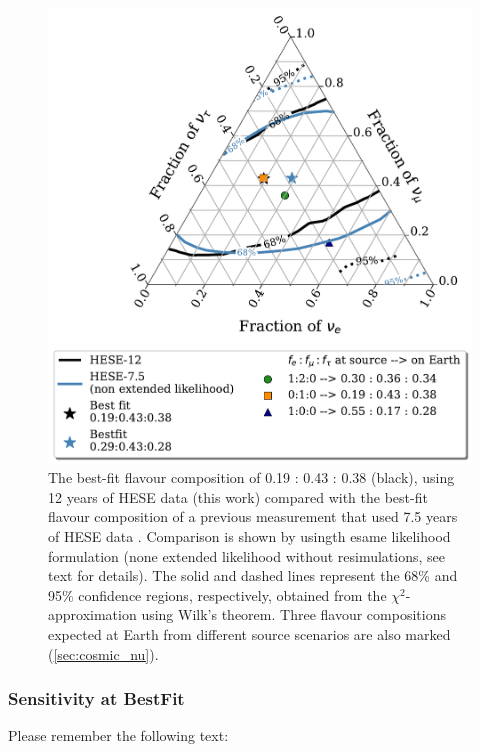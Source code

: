 \begin{figure}[h!]
    \caption{The best-fit flavour composition of 0.19 : 0.43 : 0.38 (black), using 12 years of HESE data (this work) compared with the best-fit flavour composition of a previous measurement that used 7.5 years of HESE data \cite{Juliana_paper}. Comparison is shown by usingth esame likelihood formulation (none extended likelihood without resimulations, see text for details). The solid and dashed lines represent the 68\% and 95\% confidence regions, respectively, obtained from the $\chi^2$-approximation using Wilk's theorem. Three flavour compositions expected at Earth from different source scenarios are also marked (\ref{sec:cosmic_nu}).}
    \includegraphics{./figures/results/HESE7and12_nonextendedonly.pdf}


    
\end{figure}


\subsubsection{Sensitivity at BestFit}
\label{sec:sens_bf}
Please remember the following text:


